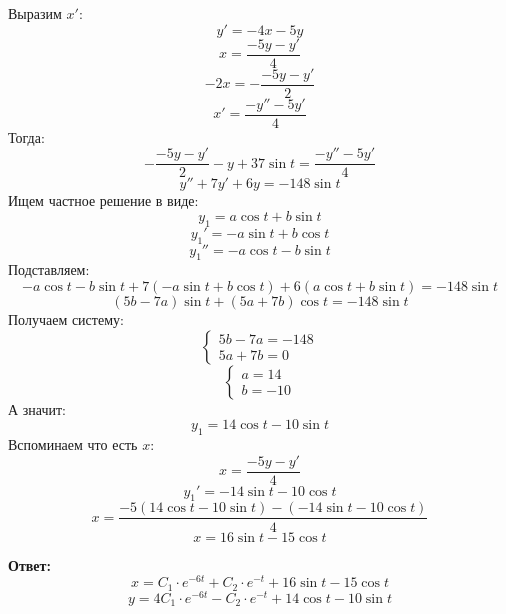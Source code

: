 \documentclass[a4paper,12pt]{article}
\begin{document}
Выразим $x'$:
\[
y' = -4x -5 y
\]
\[
x = \frac{-5y-y' }{4}
\]
\[
-2x =  -\frac{-5y-y'}{2}
\]
\[
x' = \frac{-y'' - 5y'}{4}
\]
Тогда:
\[
-\frac{-5y- y'}{2} -y + 37 \sin t =  \frac{-y'' - 5y'}{4}
\]
\[
y'' + 7y' + 6y = - 148 \sin t 
\]
Ищем частное решение в виде:
\[
y_1 =a \cos t + b \sin t 
\]
\[
y_1' = -a \sin t + b \cos t 
\]
\[
y_1'' = -a \cos t - b \sin t 
\]
Подставляем:
\[
 -a \cos t - b \sin t + 7( -a \sin t + b \cos t ) + 6(a \cos t + b \sin t ) = - 148 \sin t 
\]
\[
(5 b - 7 a) \sin t + (5 a + 7 b) \cos t = -148 \sin t
\]
Получаем систему:
\[
\begin{cases}
5b - 7a = -148 \\
5a + 7b = 0 
\end{cases}
\]
\[
\begin{cases}
a = 14\\
b = -10
\end{cases}
\]
А значит:
\[
y_1 = 14 \cos t - 10 \sin t
\]
Вспоминаем что есть $x$:
\[
x = \frac{-5y-y' }{4}
\]
\[
y_1' = -14 \sin t - 10 \cos t
\]
\[
x = \frac{-5(14 \cos t - 10 \sin t)-(-14 \sin t - 10 \cos t)}{4}
\]
\[
x =16 \sin t - 15 \cos t
\]
\begin{center}
\textbf{Ответ: } 
\[
x = C_1 \cdot e^{-6t} + C_2 \cdot e^{-t} + 16 \sin t - 15 \cos t
\]
\[
y = 4 C_1 \cdot e^{-6t} - C_2 \cdot e^{-t} + 14 \cos t - 10 \sin t
\]
\end{center}
\clearpage
\end{document}
